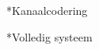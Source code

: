 \documentclass[]{article}
\begin{document}
\begin{section}
\begin{subsection}
    \end{subsection}
\end{section}
\begin{section}*{Kanaalcodering}
\end{section}
\begin{section}*{Volledig systeem}
\end{section}
\end{document}
